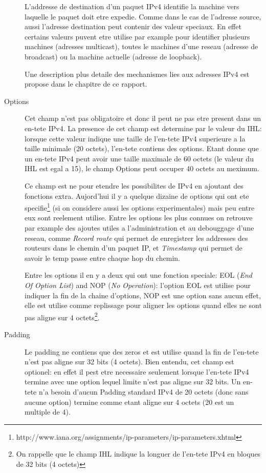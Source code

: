 \begin{description}
L'addresse de destination d'un paquet IPv4 identifie la machine vers
laquelle le paquet doit etre expedie. Comme dans le cas de l'adresse source,
aussi l'adresse destination peut contenir des valeur speciaux. En effet certains 
valeurs puvent etre utilise par example pour identifier plusieurs machines
(adresses multicast), toutes le machines d'une reseau (adresse de broadcast) ou
la machine actuelle (adresse de loopback).

Une description plus detaile des mechanismes lies aux adresses IPv4 est
propose dans le chapitre 
de ce rapport.


\item [Options] 
Cet champ n'est pas obligatoire et donc il peut ne pas etre present dans un
en-tete IPv4. La presence de cet champ est determine par le valeur du
IHL: lorsque cette valeur indique une taille de l'en-tete IPv4 superieure a 
la taille minimale (20 octets), l'en-tete contiens des options.
Etant donne que un en-tete IPv4 peut avoir une taille maximale de 
60 octets (le valeur du IHL est egal a 15), le champ Options peut occuper
40 octets au meximum.

Ce champ est ne pour etendre les possibilites de IPv4 en ajoutant des fonctions extra.
Aujord'hui il y a quelque dizaine de options qui ont ete specifie\footnote
{http://www.iana.org/assignments/ip-parameters/ip-parameters.xhtml} (si on
considere aussi les options experimentales) mais peu entre eux sont reelement
utilise. 
Entre les options les plus connues on retrouve par example des ajoutes
utiles a l'administration et au debouggage d'une reseau, comme {\it Record route}
qui permet de enregistrer les addresses des routeurs dans le chemin d'un 
paquet IP, et {\it Timestamp} qui permet de savoir le temp passe 
entre chaque hop du chemin.

Entre les options il en y a deux qui ont une fonction speciale: EOL 
({\it End Of Option List}) and NOP ({\it No Operation}): l'option EOL 
est utilise pour indiquer la fin de la chaine d'options, NOP est une option
sans aucun effet, elle est utilise comme replissage pour aligner les options 
quand elles ne sont pas aligne sur 4 octets\footnote {On rappelle que 
le champ IHL indique la longuer de l'en-tete IPv4 en bloques de 32 bits 
(4 octets)}.



\item [Padding] 
Le padding ne contiens que des zeros et est utilise quand la fin de l'en-tete
n'est pas aligne sur 32 bits (4 octets). Bien entendu, cet champ est optionel:
en effet il pest etre necessaire seulement lorsque l'en-tete IPv4 termine avec
une option lequel limite n'est pas aligne sur 32 bits. Un en-tete n'a besoin
d'aucun Padding standard IPv4 de 20 octets (donc sans aucune option) termine
comme etant aligne sur 4 octets (20 est un multiple de 4).

\end{description}
